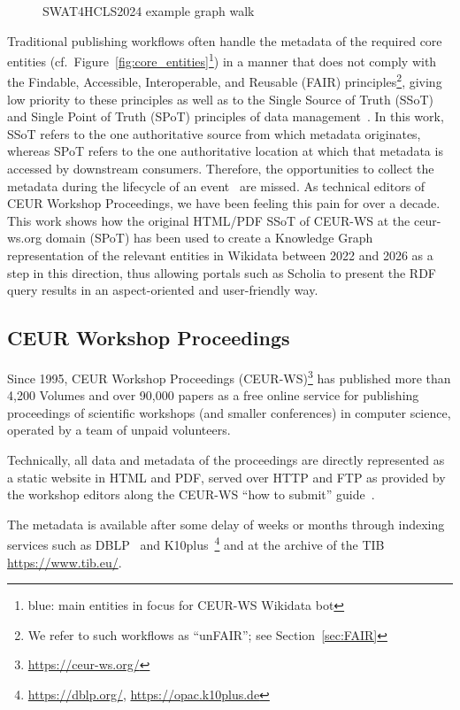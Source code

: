 \documentclass[runningheads]{llncs}
\newcommand{\tquote}[1]{``#1''}
\begin{document}
\begin{figure}[t]
    \centering
    
    \caption{SWAT4HCLS2024 example graph walk}
    \label{fig:swat4hcls_2024_instance}
\end{figure}
Traditional publishing workflows often handle the metadata of the
required core entities (cf.\ Figure~\ref{fig:core_entities}\footnote{blue: main entities in focus for CEUR-WS Wikidata bot}) in a
manner that does not comply with the Findable, Accessible,
Interoperable, and Reusable (FAIR) principles\footnote{We refer to
such workflows as \tquote{unFAIR}; see Section~\ref{sec:FAIR}},
giving low priority to these principles as well as to the Single
Source of Truth (SSoT) and Single Point of Truth (SPoT) principles
of data management~\cite{Queiroz_2024}. In this work, SSoT
refers to the one authoritative source from which metadata originates,
whereas SPoT refers to the one authoritative location at which that
metadata is accessed by downstream consumers.
Therefore, the opportunities to collect the metadata during the  lifecycle of an event~\cite{FahlHOD23} are missed. As technical editors of CEUR Workshop Proceedings, we have been feeling this pain for over a decade. This work shows how the original HTML/PDF SSoT of CEUR-WS at the ceur-ws.org domain (SPoT) has been used to create a Knowledge Graph representation of the relevant entities in Wikidata between 2022 and 2026 as a step in this direction, thus allowing portals such as Scholia to present the RDF query results in an aspect-oriented and user-friendly way.

\subsection{CEUR Workshop Proceedings}
Since 1995, CEUR Workshop Proceedings (CEUR-WS)\footnote{\url{https://ceur-ws.org/}} has published more than 4,200 Volumes and over 90,000 papers as a free online service for publishing proceedings of scientific workshops (and smaller conferences) in computer science, operated by a team of unpaid volunteers.

Technically, all data and metadata of the proceedings are directly represented as a
static website in HTML and PDF, served over HTTP and FTP as provided by the workshop editors along the CEUR-WS \tquote{how to submit} guide~\cite{CEURHowtoSubmit}.

The metadata is available after some delay of weeks or months through indexing services such as DBLP~\cite{Ley2009} and K10plus~\cite{k10plus2019}\footnote{\url{https://dblp.org/}, \url{https://opac.k10plus.de}} and at the archive of the TIB \url{https://www.tib.eu/}.
\end{document}
